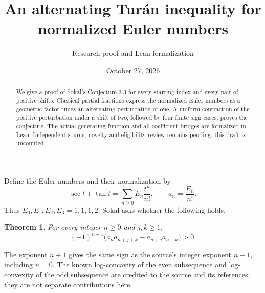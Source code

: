 \documentclass[11pt]{article}
\title{An alternating Tur\'an inequality for normalized Euler numbers}
\author{Research proof and Lean formalization}
\date{October 27, 2026}
\newtheorem{theorem}{Theorem}
\begin{document}
\maketitle
\begin{abstract}
We give a proof of Sokal's Conjecture 3.3 for every starting index and every pair of positive shifts. Classical partial fractions express the normalized Euler numbers as a geometric factor times an alternating perturbation of one. A uniform contraction of the positive perturbation under a shift of two, followed by four finite sign cases, proves the conjecture. The actual generating function and all coefficient bridges are formalized in Lean. Independent source, novelty and eligibility review remains pending; this draft is uncounted.
\end{abstract}

Define the Euler numbers and their normalization by
\[
 \sec t+\tan t=\sum_{n\geq0}E_n\frac{t^n}{n!},\qquad a_n=\frac{E_n}{n!}.
\]
Thus $E_0,E_1,E_2,E_3=1,1,1,2$. Sokal \cite[Conjecture 3.3, p.~14]{Sokal} asks whether the following holds.
\begin{theorem}\label{main}
For every integer $n\geq0$ and $j,k\geq1$,
\[
 (-1)^{n+1}\bigl(a_na_{n+j+k}-a_{n+j}a_{n+k}\bigr)>0.
\]
\end{theorem}
The exponent $n+1$ gives the same sign as the source's integer exponent $n-1$, including $n=0$. The known log-concavity of the even subsequence and log-convexity of the odd subsequence are credited to the source and its references; they are not separate contributions here.
\end{document}
